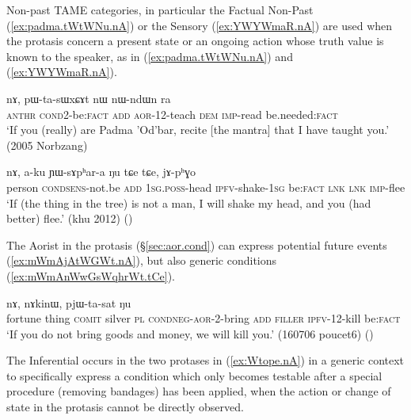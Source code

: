 Non-past TAME categories, in particular the Factual Non-Past (\ref{ex:padma.tWtWNu.nA}) or the Sensory (\ref{ex:YWYWmaR.nA}) are used when the protasis concern a present state or an ongoing action whose truth value is known to the speaker, as in (\ref{ex:padma.tWtWNu.nA}) and (\ref{ex:YWYWmaR.nA}).

\begin{exe}
\ex \label{ex:padma.tWtWNu.nA}
  nɤ, pɯ-ta-sɯxɕɤt nɯ nɯ-ndɯn ra \\
  \textsc{anthr} \textsc{cond}\redp{}2-be:\textsc{fact} \textsc{add} \textsc{aor}-1\fl{}2-teach \textsc{dem} \textsc{imp}-read be.needed:\textsc{fact} \\
 \glt `If you (really) are Padma 'Od'bar, recite [the mantra] that I have taught you.' (2005 Norbzang)
\end{exe}

\begin{exe}
\ex \label{ex:YWYWmaR.nA}
  nɤ, a-ku ɲɯ-sɤpʰar-a ŋu tɕe tɕe, jɤ-pʰɣo \\
 person \textsc{cond}\redp{}\textsc{sens}-not.be \textsc{add} \textsc{1sg}.\textsc{poss}-head \textsc{ipfv}-shake-\textsc{1sg} be:\textsc{fact} \textsc{lnk} \textsc{lnk} \textsc{imp}-flee \\
\glt `If (the thing in the tree) is not a man, I will shake my head, and you (had better) flee.' (khu 2012)
()
\end{exe}

The Aorist in the protasis (§\ref{sec:aor.cond}) can express potential future events  (\ref{ex:mWmAjAtWGWt.nA}), but also generic conditions (\ref{ex:mWmAnWwGsWqhrWt.tCe}).

\begin{exe}
\ex \label{ex:mWmAjAtWGWt.nA}
  nɤ, nɤkinɯ, pjɯ-ta-sat ŋu \\
 fortune thing \textsc{comit} silver \textsc{pl} \textsc{cond}\redp{}\textsc{neg}-\textsc{aor}-2-bring \textsc{add} \textsc{filler} \textsc{ipfv}-1\fl{}2-kill be:\textsc{fact} \\
 \glt `If you do not bring goods and money, we will kill you.' (160706 poucet6)
()
 \end{exe}

The Inferential occurs in the two protases in (\ref{ex:Wtope.nA}) in a generic context to specifically express a condition which only becomes testable after a special procedure (removing bandages) has been applied, when the action or change of state in the protasis cannot be directly observed.

